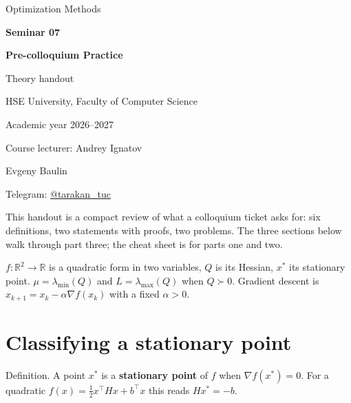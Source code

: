 \documentclass[11pt,a4paper]{article}
\begin{document}
\begin{center}
  {\large\color{hsegray}Optimization Methods\par}
  \vspace{4pt}
  {\large\bfseries\color{hseaccent}Seminar 07\par}
  \vspace{8pt}
  {\LARGE\bfseries\color{hseblue}Pre-colloquium Practice\par}
  \vspace{8pt}
  {\Large Theory handout\par}
  \vspace{12pt}
  HSE University, Faculty of Computer Science\par
  Academic year 2026--2027\par
  \vspace{8pt}
  Course lecturer: Andrey Ignatov\par
  Evgeny Baulin\par
  Telegram: \href{https://t.me/tarakan_tuc}{@tarakan\_tuc}\par
\end{center}

\noindent{\color{hseblue}\rule{\linewidth}{0.6pt}}

\tableofcontents

\clearpage

This handout is a compact review of what a colloquium ticket asks for: six definitions, two statements with proofs, two problems. The three sections below walk through part three; the cheat sheet is for parts one and two.

\begin{conventionbox}
$f:\mathbb R^2\to\mathbb R$ is a quadratic form in two variables, $Q$ is its Hessian, $x^*$ its stationary point. $\mu=\lambda_{\min}(Q)$ and $L=\lambda_{\max}(Q)$ when $Q\succ0$. Gradient descent is $x_{k+1}=x_k-\alpha\nabla f(x_k)$ with a fixed $\alpha>0$.
\end{conventionbox}

\section{Classifying a stationary point}\label{sec:classify}

\begin{definitionbox}{Definition.}
A point $x^*$ is a \textbf{stationary point} of $f$ when $\nabla f(x^*)=0$. For a quadratic $f(x)=\tfrac{1}{2}x^\top Hx+b^\top x$ this reads $Hx^*=-b$.
\end{definitionbox}
\end{document}
